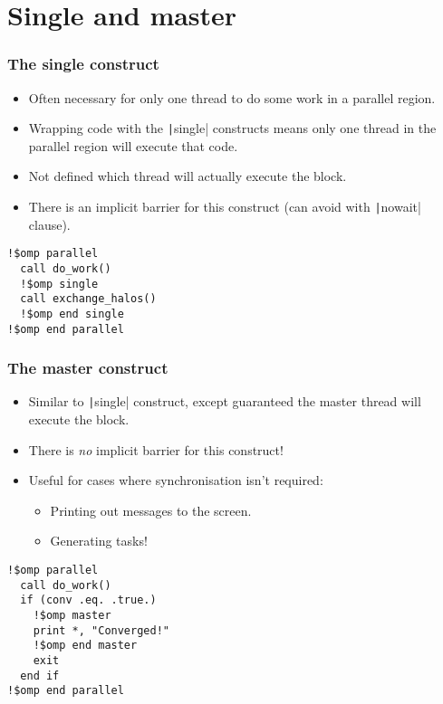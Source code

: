 \documentclass{beamer}
\begin{document}
\section{Single and master}
\begin{frame}[fragile]
\frametitle{The single construct}
\begin{itemize}
  \item Often necessary for only one thread to do some work in a parallel region.
  \item Wrapping code with the \texttt|single| constructs means only one thread in the parallel region will execute that code.
  \item Not defined which thread will actually execute the block.
  \item There is an implicit barrier for this construct (can avoid with \texttt|nowait| clause).
\end{itemize}

\begin{verbatim}
!$omp parallel
  call do_work()
  !$omp single
  call exchange_halos()
  !$omp end single
!$omp end parallel
\end{verbatim}
\end{frame}

\begin{frame}[fragile]
\frametitle{The master construct}
\begin{itemize}
  \item Similar to \texttt|single| construct, except guaranteed the master thread will execute the block.
  \item There is \emph{no} implicit barrier for this construct!
  \item Useful for cases where synchronisation isn't required:
    \begin{itemize}
      \item Printing out messages to the screen.
      \item Generating tasks!
    \end{itemize}
\end{itemize}

\begin{verbatim}
!$omp parallel
  call do_work()
  if (conv .eq. .true.)
    !$omp master
    print *, "Converged!"
    !$omp end master
    exit
  end if
!$omp end parallel
\end{verbatim}
\end{frame}
\end{document}
